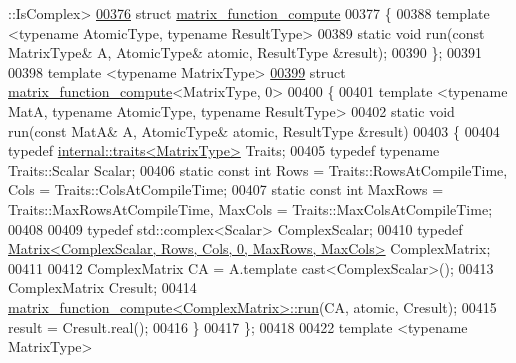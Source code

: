 \begin{DoxyCode}
      ::IsComplex>
\hyperlink{struct_eigen_1_1internal_1_1matrix__function__compute}{00376} \textcolor{keyword}{struct }\hyperlink{struct_eigen_1_1internal_1_1matrix__function__compute}{matrix\_function\_compute}
00377 \{  
00388     \textcolor{keyword}{template} <\textcolor{keyword}{typename} AtomicType, \textcolor{keyword}{typename} ResultType> 
00389     \textcolor{keyword}{static} \textcolor{keywordtype}{void} run(\textcolor{keyword}{const} MatrixType& A, AtomicType& atomic, ResultType &result);    
00390 \};
00391 
00398 \textcolor{keyword}{template} <\textcolor{keyword}{typename} MatrixType>
\hyperlink{struct_eigen_1_1internal_1_1matrix__function__compute_3_01_matrix_type_00_010_01_4}{00399} \textcolor{keyword}{struct }\hyperlink{struct_eigen_1_1internal_1_1matrix__function__compute}{matrix\_function\_compute}<MatrixType, 0>
00400 \{  
00401   \textcolor{keyword}{template} <\textcolor{keyword}{typename} MatA, \textcolor{keyword}{typename} AtomicType, \textcolor{keyword}{typename} ResultType>
00402   \textcolor{keyword}{static} \textcolor{keywordtype}{void} run(\textcolor{keyword}{const} MatA& A, AtomicType& atomic, ResultType &result)
00403   \{
00404     \textcolor{keyword}{typedef} \hyperlink{struct_eigen_1_1internal_1_1traits}{internal::traits<MatrixType>} Traits;
00405     \textcolor{keyword}{typedef} \textcolor{keyword}{typename} Traits::Scalar Scalar;
00406     \textcolor{keyword}{static} \textcolor{keyword}{const} \textcolor{keywordtype}{int} Rows = Traits::RowsAtCompileTime, Cols = Traits::ColsAtCompileTime;
00407     \textcolor{keyword}{static} \textcolor{keyword}{const} \textcolor{keywordtype}{int} MaxRows = Traits::MaxRowsAtCompileTime, MaxCols = Traits::MaxColsAtCompileTime;
00408 
00409     \textcolor{keyword}{typedef} std::complex<Scalar> ComplexScalar;
00410     \textcolor{keyword}{typedef} \hyperlink{group___core___module_class_eigen_1_1_matrix}{Matrix<ComplexScalar, Rows, Cols, 0, MaxRows, MaxCols>}
       ComplexMatrix;
00411 
00412     ComplexMatrix CA = A.template cast<ComplexScalar>();
00413     ComplexMatrix Cresult;
00414     \hyperlink{struct_eigen_1_1internal_1_1matrix__function__compute_a55a328773f5254d0cd29ac699bc2634f}{matrix\_function\_compute<ComplexMatrix>::run}(CA, atomic, 
      Cresult);
00415     result = Cresult.real();
00416   \}
00417 \};
00418 
00422 \textcolor{keyword}{template} <\textcolor{keyword}{typename} MatrixType>

\end{DoxyCode}
